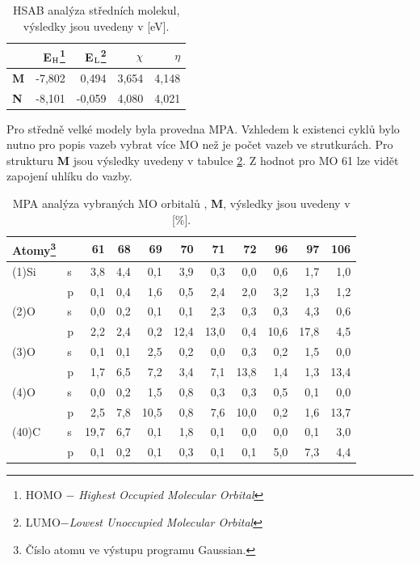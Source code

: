 \documentclass[
digital, %
table,   %
lof,     %
lot,     %
oneside,
]{fithesis3}
\begin{document}
\begin{table}[htbp]
\begin{minipage}{\textwidth}
\caption{HSAB analýza středních molekul, výsledky jsou uvedeny v [eV].}
\begin{center}
\begin{tabular}{|l|r|r|r|r|}
\hline
\label{hsab_middle}& E$_{\ce{H}}$\footnote{HOMO $-$ \textit{Highest Occupied Molecular Orbital}}  & E$_{\ce{L}}$\footnote{LUMO$ - $\textit{Lowest Unoccupied Molecular Orbital}} & $\chi$  & $\eta$ \\ \hline
\textbf{M} & -7,802 & 0,494 & 3,654 & 4,148 \\ \hline
\textbf{N} & -8,101 & -0,059 & 4,080 & 4,021 \\ \hline
\end{tabular}
\end{center}
\end{minipage}
\end{table}

Pro středně velké modely byla provedna MPA. Vzhledem k existenci cyklů bylo nutno pro popis vazeb vybrat více MO než je počet vazeb ve strutkurách. Pro strukturu \textbf{M} jsou výsledky uvedeny v tabulce \ref{si_model_methyl_MPA_I}. Z hodnot pro MO 61 lze vidět zapojení uhlíku do vazby.

\begin{table}[htbp]\begin{minipage}{\textwidth}
\caption{MPA analýza vybraných MO orbitalů , \textbf{M}, výsledky jsou uvedeny v [\%].}
\begin{center}
\begin{tabular}{|l|l|r|r|r|r|r|r|r|r|r|}
\hline
Atomy\footnote{Číslo atomu ve výstupu programu Gaussian.}   \label{si_model_methyl_MPA_I}  &  & 61 & 68 & 69 & 70 & 71 & 72 & 96 & 97 & 106 \\ \hline
(1)Si  & s & 3,8  & 4,4 &  0,1  & 3,9  & 0,3  & 0,0  & 0,6  & 1,7  & 1,0  \\ \hline
& p & 0,1  & 0,4& 1,6  & 0,5  & 2,4  & 2,0  & 3,2  & 1,3  & 1,2  \\ \hline
(2)O & s & 0,0  & 0,2& 0,1  & 0,1  & 2,3  & 0,3  & 0,3  & 4,3  & 0,6  \\ \hline
& p & 2,2  & 2,4& 0,2  & 12,4  & 13,0  & 0,4  & 10,6  & 17,8  & 4,5  \\ \hline
(3)O & s & 0,1  & 0,1& 2,5  & 0,2  & 0,0  & 0,3  & 0,2  & 1,5  & 0,0  \\ \hline
& p & 1,7  & 6,5 &7,2  & 3,4  & 7,1  & 13,8  & 1,4  & 1,3  & 13,4  \\ \hline
(4)O & s & 0,0  & 0,2& 1,5  & 0,8  & 0,3  & 0,3  & 0,5  & 0,1  & 0,0  \\ \hline
& p & 2,5  & 7,8& 10,5  & 0,8  & 7,6  & 10,0  & 0,2  & 1,6  & 13,7  \\ \hline
(40)C & s & 19,7  & 6,7& 0,1  & 1,8  & 0,1  & 0,0  & 0,0  & 0,1  & 3,0  \\ \hline
& p & 0,1  & 0,2& 0,1  & 0,3  & 0,1  & 0,1  & 5,0  & 7,3  & 4,4  \\ \hline
\end{tabular}
\end{center}\end{minipage}\end{table}
\end{document}
